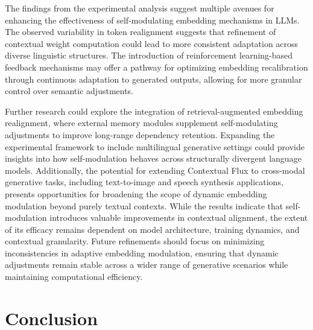 \documentclass{article}
\begin{document}
The findings from the experimental analysis suggest multiple avenues for enhancing the effectiveness of self-modulating embedding mechanisms in LLMs. The observed variability in token realignment suggests that refinement of contextual weight computation could lead to more consistent adaptation across diverse linguistic structures. The introduction of reinforcement learning-based feedback mechanisms may offer a pathway for optimizing embedding recalibration through continuous adaptation to generated outputs, allowing for more granular control over semantic adjustments.

Further research could explore the integration of retrieval-augmented embedding realignment, where external memory modules supplement self-modulating adjustments to improve long-range dependency retention. Expanding the experimental framework to include multilingual generative settings could provide insights into how self-modulation behaves across structurally divergent language models. Additionally, the potential for extending Contextual Flux to cross-modal generative tasks, including text-to-image and speech synthesis applications, presents opportunities for broadening the scope of dynamic embedding modulation beyond purely textual contexts. While the results indicate that self-modulation introduces valuable improvements in contextual alignment, the extent of its efficacy remains dependent on model architecture, training dynamics, and contextual granularity. Future refinements should focus on minimizing inconsistencies in adaptive embedding modulation, ensuring that dynamic adjustments remain stable across a wider range of generative scenarios while maintaining computational efficiency.



\section{Conclusion}
\end{document}
